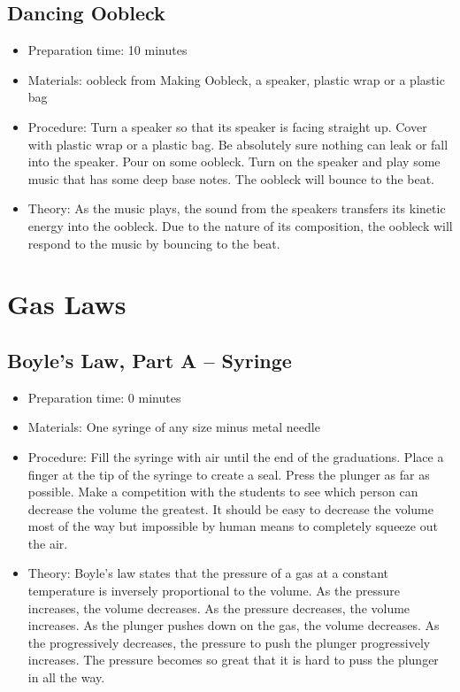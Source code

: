 \subsection{Dancing Oobleck}
\begin{itemize}
\item{Preparation time: 10 minutes}
\item{Materials: oobleck from Making Oobleck, a speaker, plastic wrap or a plastic bag}
\item{Procedure: Turn a speaker so that its speaker is facing straight up. Cover with plastic wrap or a plastic bag. Be absolutely sure nothing can leak or fall into the speaker. Pour on some oobleck. Turn on the speaker and play some music that has some deep base notes. The oobleck will bounce to the beat.}
\item{Theory: As the music plays, the sound from the speakers transfers its kinetic energy into the oobleck. Due to the nature of its composition, the oobleck will respond to the music by bouncing to the beat.}
\end{itemize}

\section{Gas Laws}

\subsection{Boyle's Law, Part A -- Syringe}
\begin{itemize}
\item{Preparation time: 0 minutes}
\item{Materials: One syringe of any size minus metal needle}
\item{Procedure: Fill the syringe with air until the end of the graduations. Place a finger at the tip of the syringe to create a seal. Press the plunger as far as possible. Make a competition with the students to see which person can decrease the volume the greatest. It should be easy to decrease the volume most of the way but impossible by human means to completely squeeze out the air.}
\item{Theory: Boyle’s law states that the pressure of a gas at a constant temperature is inversely proportional to the volume. As the pressure increases, the volume decreases. As the pressure decreases, the volume increases. As the plunger pushes down on the gas, the volume decreases. As the progressively decreases, the pressure to push the plunger progressively increases. The pressure becomes so great that it is hard to puss the plunger in all the way.}
\end{itemize}

